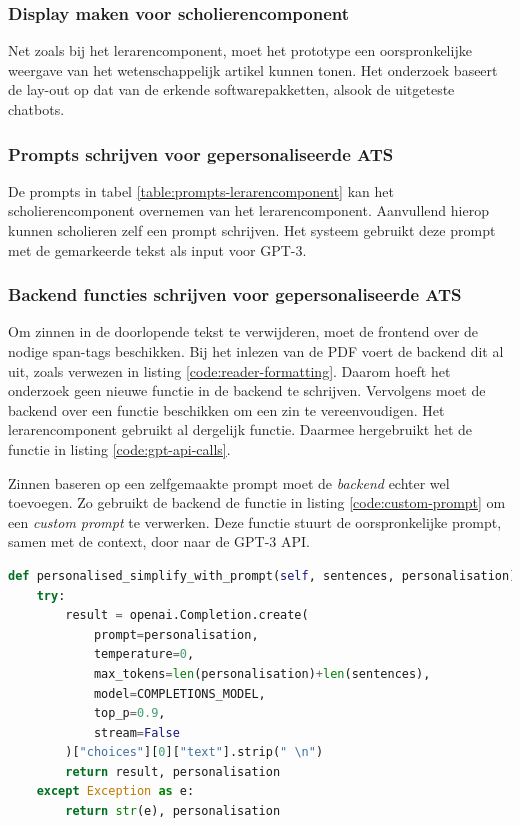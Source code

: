 \subsubsection{Display maken voor scholierencomponent}

Net zoals bij het lerarencomponent, moet het prototype een oorspronkelijke weergave van het wetenschappelijk artikel kunnen tonen. Het onderzoek baseert de lay-out op dat van de erkende softwarepakketten, alsook de uitgeteste chatbots. 

\subsubsection{Prompts schrijven voor gepersonaliseerde ATS}

De prompts in tabel \ref{table:prompts-lerarencomponent} kan het scholierencomponent overnemen van het lerarencomponent. Aanvullend hierop kunnen scholieren zelf een prompt schrijven. Het systeem gebruikt deze prompt met de gemarkeerde tekst als input voor GPT-3.

\subsubsection{Backend functies schrijven voor gepersonaliseerde ATS}

Om zinnen in de doorlopende tekst te verwijderen, moet de frontend over de nodige span-tags beschikken. Bij het inlezen van de PDF voert de backend dit al uit, zoals verwezen in listing \ref{code:reader-formatting}. Daarom hoeft het onderzoek geen nieuwe functie in de backend te schrijven. Vervolgens moet de backend over een functie beschikken om een zin te vereenvoudigen. Het lerarencomponent gebruikt al dergelijk functie. Daarmee hergebruikt het de functie in listing \ref{code:gpt-api-calls}. 

\medspace

Zinnen baseren op een zelfgemaakte prompt moet de \textit{backend} echter wel toevoegen. Zo gebruikt de backend de functie in listing \ref{code:custom-prompt} om een \textit{custom prompt} te verwerken. Deze functie stuurt de oorspronkelijke prompt, samen met de context, door naar de GPT-3 API.

\begin{lstlisting}[language=python, caption={Een API-call sturen naar GPT-3 met een custom prompt.}, label={code:custom-prompt}]
def personalised_simplify_with_prompt(self, sentences, personalisation):
	try:
		result = openai.Completion.create(
			prompt=personalisation,
			temperature=0,
			max_tokens=len(personalisation)+len(sentences),
			model=COMPLETIONS_MODEL,
			top_p=0.9,
			stream=False
		)["choices"][0]["text"].strip(" \n")
		return result, personalisation
	except Exception as e:
		return str(e), personalisation
\end{lstlisting}

